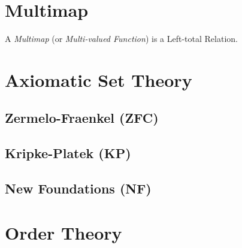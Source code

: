 \documentclass{article}
\begin{document}
\section{Multimap}\label{sec:multimap}

A \emph{Multimap} (or \emph{Multi-valued Function}) is a Left-total
Relation.



\section{Axiomatic Set Theory}\label{sec:axiomatic_set_theory}

\subsection{Zermelo-Fraenkel (ZFC)}\label{subsec:zermelo_fraenkel}

\subsection{Kripke-Platek (KP)}\label{subsec:kripke_platek}

\subsection{New Foundations (NF)}\label{subsec:quine_foundations}



\section{Order Theory}\label{sec:order_theory}
\end{document}
